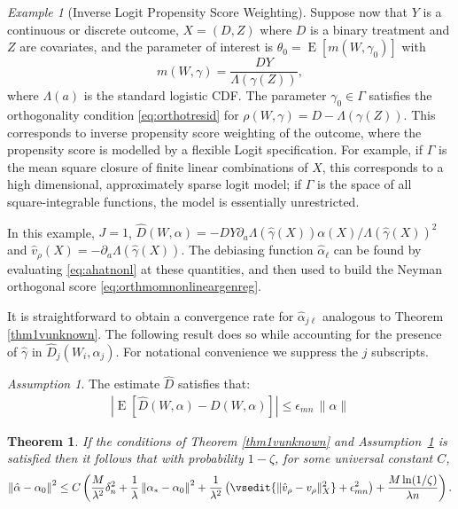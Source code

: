 \documentclass[aos]{imsart}
\numberwithin{equation}{section}
\theoremstyle{plain}
\newtheorem{theorem}{Theorem}[section]
\theoremstyle{remark}
\newtheorem{example}{Example}
\newtheorem{assumption}{Assumption}
\DeclareMathOperator{\E}{E}
\begin{document}
\begin{example}[Inverse Logit Propensity Score Weighting]
    Suppose now that $Y$ is a continuous or discrete outcome, $X = (D, Z)$  where $D$ is a binary treatment and $Z$ are covariates, and the parameter of interest is $\theta_0 = \E[m(W, \gamma_0)]$ with $$m(W, \gamma) = \frac{DY}{\Lambda(\gamma(Z))},$$ where $\Lambda(a)$ is the standard logistic CDF. The parameter $\gamma_0 \in \Gamma$ satisfies the orthogonality condition \eqref{eq:orthotresid} for $\rho(W,\gamma)=D-\Lambda(\gamma(Z))$. This corresponds to inverse propensity score weighting of the outcome, where the propensity score is modelled by a flexible Logit specification. For example, if $\Gamma$ is the mean square closure of finite linear combinations of $X$, this corresponds to a high dimensional, approximately sparse logit model; if $\Gamma$ is the space of all square-integrable functions, the model is essentially unrestricted.

    In this example, $J = 1$, $\hat D(W, \alpha) = - DY \partial_a\Lambda(\hat\gamma(X)) \alpha(X)/\Lambda(\hat\gamma(X))^2$ and $\hat v_\rho(X) = -\partial_a\Lambda(\hat\gamma(X))$. The debiasing function $\hat\alpha_\ell$ can be found by evaluating \eqref{eq:ahatnonl} at these quantities, and then used to build the Neyman orthogonal score \eqref{eq:orthmomnonlineargenreg}.
\end{example}

It is straightforward to obtain a convergence rate for $\hat{\alpha}_{j\ell}$ analogous to Theorem \ref{thm1vunknown}. The following result does so while accounting for the presence of $\hat{\gamma}$ in $\hat{D}_{j}(W_{i},\alpha_{j}).$ For notational
convenience we suppress the $j$ subscripts.

\begin{assumption}\label{ass-der-estimate}
The estimate $\hat{D}$ satisfies that:
\begin{align}
    |\E[\hat{D}(W, \alpha) - D(W, \alpha)]| \leq \epsilon_{mn}\, \|\alpha\|
\end{align}
\end{assumption}
\begin{theorem} \label{thm1nonlin} If the conditions of Theorem \ref{thm1vunknown} and Assumption~\ref{ass-der-estimate} is satisfied then it follows that with probability $1-\zeta$, for some universal constant $C$,
\[
\left\Vert \hat{\alpha}-\alpha_{0}\right\Vert ^{2}\leq C\left(\frac{M}{\lambda^2}\delta_{n}%
^{2}+ \frac{1}{\lambda} \left\Vert \alpha_{\ast}-\alpha_{0}\right\Vert ^{2} + \frac{1}{\lambda^2} \left(\vsedit{\|\hat{v}_\rho - v_\rho\|_X^2} + \epsilon_{mn}^2\right) + \frac{M\ln(1/\zeta
)}{\lambda n}\right).
\]
\end{theorem}
\end{document}
